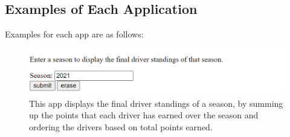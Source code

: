 \documentclass{article} %
\begin{document}
\subsection{Examples of Each Application}

Examples for each app are as follows:
\begin{figure}[H]
    \centering
    \includegraphics[scale=0.35]{1.PNG}
    \caption{This app displays the final driver standings of a season,
    by summing up the points that each driver has earned over the season
    and ordering the drivers based on total points earned.}
\end{figure}
\end{document}
